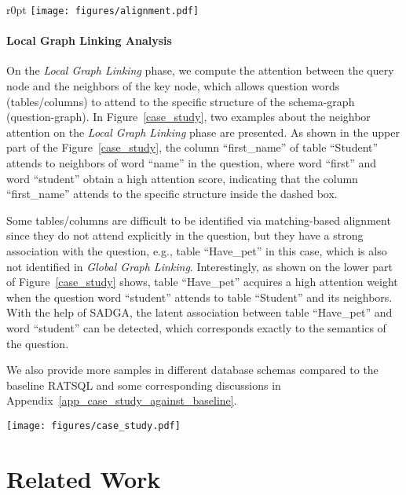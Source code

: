 \documentclass{article}
\begin{document}
\begin{wrapfigure}{r}{0pt}
    \texttt{[image: figures/alignment.pdf]}
    \caption{Alignment between question words and tables/columns on the \emph{Global Graph Linking} phase.}
    \label{alignment}
\end{wrapfigure}

\paragraph{Local Graph Linking Analysis}
On the \emph{Local Graph Linking} phase, we compute the attention between the query node and the neighbors of the key node, which allows question words (tables/columns) to attend to the specific structure of the schema-graph (question-graph). In Figure~\ref{case_study}, two examples about the neighbor attention on the \emph{Local Graph Linking} phase are presented. As shown in the upper part of the Figure~\ref{case_study}, the column ``first\_name'' of table ``Student'' attends to neighbors of word ``name'' in the question, where word ``first'' and word ``student'' obtain a high attention score, indicating that the column ``first\_name'' attends to the specific structure inside the dashed box.

Some tables/columns are difficult to be identified via matching-based alignment since they do not attend explicitly in the question, but they have a strong association with the question, e.g., table ``Have\_pet'' in this case, which is also not identified in \emph{Global Graph Linking}. Interestingly, as shown on the lower part of Figure~\ref{case_study} shows, table ``Have\_pet'' acquires a high attention weight when the question word ``student'' attends to table ``Student'' and its neighbors. 
With the help of SADGA, the latent association between table ``Have\_pet'' and word ``student'' can be detected, which corresponds exactly to the semantics of the question.

We also provide more samples in different database schemas compared to the baseline RATSQL and some corresponding discussions in Appendix~\ref{app_case_study_against_baseline}.

\begin{figure*}[hbt]
\centering
  \texttt{[image: figures/case\_study.pdf]}
  \caption{Analysis on the \emph{Local Graph Linking} phase.} 
  \label{case_study}
\end{figure*}

\section{Related Work}
\end{document}
